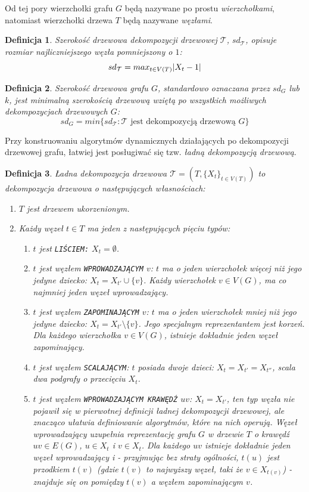 \documentclass[12pt, oneside]{report}
\newtheorem{definition}{Definicja}
\begin{document}
Od tej pory wierzchołki grafu $G$ będą nazywane po prostu \emph{wierzchołkami}, natomiast wierzchołki drzewa $T$ będą nazywane \emph{węzłami}.

\begin{definition}
\em \emph{Szerokość drzewowa dekompozycji drzewowej $\mathcal{T}$}, $sd_\mathcal{T}$, opisuje rozmiar najliczniejszego węzła pomniejszony o $1$: $$sd_\mathcal{T} = max_{t \in V(T)} \abs{X_t - 1}$$ 
\end{definition}

\begin{definition}
\em \emph{Szerokość drzewowa grafu $G$}, standardowo oznaczana przez $sd_G$ lub $k$, jest minimalną szerokością drzewową wziętą po wszystkich możliwych dekompozycjach drzewowych $G$: $$sd_G = min \{sd_\mathcal{T}: \mathcal{T} \text{ jest dekompozycją drzewową }G\}$$
\end{definition}

Przy konstruowaniu algorytmów dynamicznych działających po dekompozycji drzewowej grafu, łatwiej jest posługiwać się tzw. \emph{ładną dekompozycją drzewową}.

\begin{definition}
\em \emph{Ładna dekompozycja drzewowa} $\mathcal{T} = (T, \{X_t\}_{t \in V(T)})$ to dekompozycja drzewowa o następujących własnościach:
\begin{enumerate}[label=(\roman*)]
	\item{$T$ jest drzewem ukorzenionym.}
	\item{Każdy węzeł $t \in T$ ma jeden z następujących pięciu typów:}
	\begin{enumerate}[label=\arabic*)]
		\item{$t$ jest \texttt{LIŚCIEM:} $X_t = \emptyset$.}
		\item{$t$ jest węzłem \texttt{WPROWADZAJĄCYM} $v$: $t$ ma o jeden wierzchołek więcej niż jego jedyne dziecko: $X_t = X_{t'} \cup \{v\}$. Każdy wierzchołek $v \in V(G)$, ma co najmniej jeden węzeł wprowadzający.}
		\item{$t$ jest węzłem \texttt{ZAPOMINAJĄCYM} $v$: $t$ ma o jeden wierzchołek mniej niż jego jedyne dziecko: $X_t = X_{t'} \setminus \{v\}$. Jego specjalnym reprezentantem jest korzeń. Dla każdego wierzchołka $v \in V(G)$, istnieje dokładnie jeden węzeł zapominający.}
		\item{$t$ jest węzłem \texttt{SCALAJĄCYM}: $t$ posiada dwoje dzieci: $X_t = X_{t'} = X_{t''}$, scala dwa podgrafy o przecięciu $X_t$.}
		\item{$t$ jest węzłem \texttt{WPROWADZAJĄCYM KRAWĘDŹ} $uv$: $X_t = X_{t'}$, ten typ węzła nie pojawił się w pierwotnej definicji ładnej dekompozycji drzewowej, ale znacząco ułatwia definiowanie algorytmów, które na nich operują. Węzeł wprowadzający uzupełnia reprezentację grafu $G$ w drzewie $T$ o krawędź $uv \in E(G)$, $u \in X_t$ i $v \in X_t$. Dla każdego $uv$ istnieje dokładnie jeden węzeł wprowadzający i - przyjmując bez straty ogólności, $t(u)$ jest przodkiem $t(v)$ (gdzie $t(v)$ to najwyższy węzeł, taki że $v \in X_{t(v)}$) - znajduje się on pomiędzy $t(v)$ a węzłem zapominającym $v$.}
\end{enumerate}
\end{enumerate}
\end{definition}
\end{document}
